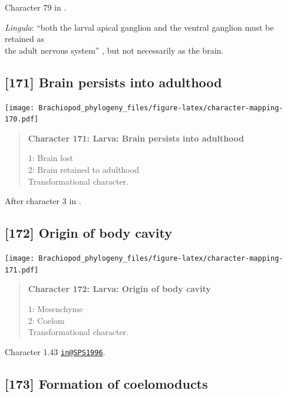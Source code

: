 \documentclass[openany]{book}
\begin{document}
Character 79 in \citet{Glenner2004}.

\hypertarget{Lingula-coding-170}{}
\emph{Lingula}: ``both the larval apical ganglion and the ventral
ganglion must be retained as\\
the adult nervous system'' \citep{HaySchmidt1992}, but not necessarily
as the brain.

\subsection*{{[}171{]} Brain persists into
adulthood}\label{brain-persists-into-adulthood}

\texttt{[image: Brachiopod\_phylogeny\_files/figure-latex/character-mapping-170.pdf]}

\begin{quote}
\textbf{Character 171: Larva: Brain persists into adulthood}

1: Brain lost\\
2: Brain retained to adulthood\\
Transformational character.
\end{quote}

After character 3 in \citet{Richter2010}.

\subsection*{{[}172{]} Origin of body
cavity}\label{origin-of-body-cavity}

\texttt{[image: Brachiopod\_phylogeny\_files/figure-latex/character-mapping-171.pdf]}

\begin{quote}
\textbf{Character 172: Larva: Origin of body cavity}

1: Mesenchyme\\
2: Coelom\\
Transformational character.
\end{quote}

Character 1.43 \href{mailto:in@SPS1996}{\nolinkurl{in@SPS1996}}.

\subsection*{{[}173{]} Formation of
coelomoducts}\label{formation-of-coelomoducts}
\end{document}
